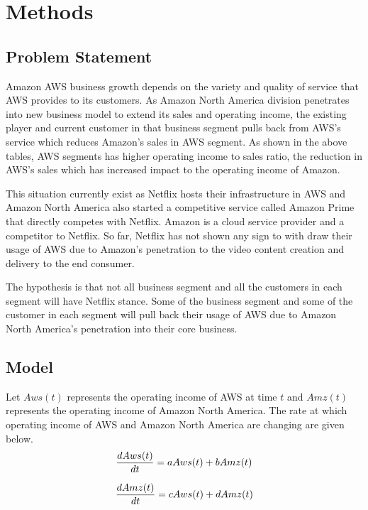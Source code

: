 \documentclass[fleqn,10pt]{SelfArx} %
\begin{document}
\section{Methods}

\subsection{Problem Statement}
Amazon AWS business growth depends on the variety and quality of service that AWS provides to its customers. As Amazon North America division penetrates into new business model to extend its sales and operating income, the existing player and current customer in that business segment pulls back from AWS's service which reduces Amazon's sales in AWS segment. As shown in the above tables, AWS segments has higher operating income to sales ratio, the reduction in AWS's sales which has increased impact to the operating income of Amazon. 

This situation currently exist as Netflix hosts their infrastructure in AWS and Amazon North America also started a competitive service called Amazon Prime that directly competes with Netflix. Amazon is a cloud service provider and a competitor to Netflix. So far, Netflix has not shown any sign to with draw their usage of AWS due to Amazon's penetration to the video content creation and delivery to the end consumer. 

The hypothesis is that not all business segment and all the customers in each segment will have Netflix stance. Some of the business segment and some of the customer in each segment will pull back their usage of AWS due to Amazon North America's penetration into their core business.

\subsection{Model}
Let $Aws(t)$ represents the operating income of AWS at time $t$ and $Amz(t)$ represents the operating income of Amazon North America.  
The rate at which operating income of AWS and Amazon North America are changing are given below. 
\begin{equation} \centering
\frac{dAws(t)}{dt} = aAws(t) + bAmz(t) 
\label{eq:refnamel}
\end{equation}

\begin{equation} \centering
\frac{dAmz(t)}{dt} = cAws(t) + dAmz(t)
\label{eq:refname2}
\end{equation}
\end{document}

